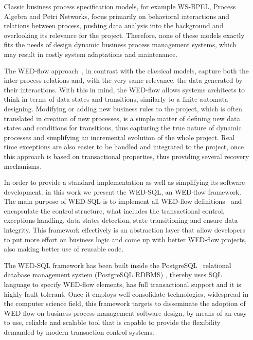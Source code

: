 \documentclass[12pt]{article}
\begin{document}
\par  Classic business process specification models, for example WS-BPEL, Process Algebra and Petri Networks, focus primarily
on behavioral interactions and relations between process, pushing data analysis into the background and overlooking its
relevance for the project. Therefore, none of these models exactly fits the needs of design dynamic business process 
management systems, which may result in costly system adaptations and maintenance.

\par  The WED-flow approach~\cite{ICWS12}, in contrast with the classical models, capture both the inter-process relations 
and, with the very same relevance, the data generated by their interactions. With this in mind, the WED-flow allows systems architects to 
think in terms of data states and transitions, similarly to a finite automata designing. Modifying or adding new business 
rules to the project, which is often translated in creation of new processes, is a simple matter of defining new data states 
and conditions for transitions, thus capturing the true nature of dynamic processes and simplifying an incremental evolution 
of the whole project. Real time exceptions are also easier to be handled and integrated to the project, once this approach
is based on transactional properties, thus providing several recovery mechanisms.

\par In order to provide a standard implementation as well as simplifying its software development, in this work we present 
the WED-SQL, an WED-flow framework. The main purpose of WED-SQL is to implement all WED-flow definitions~\cite{FTPM10} and encapsulate 
the control structure, what includes the transactional control, exceptions handling, data states detection, state transitioning 
and ensure data integrity. This framework effectively is an abstraction layer that allow developers to put more effort
on business logic and come up with better WED-flow projects, also making better use of reusable code. 

\par The WED-SQL framework has been built inside the PostgreSQL~\cite{PSQL} relational database management system (PostgreSQL RDBMS)
, thereby uses SQL language
to specify WED-flow elements, has full transactional support and it is highly fault tolerant. Once it employs well consolidate 
technologies, widespread in the computer science field, this framework targets to disseminate the adoption of WED-flow on
business process management software design, by means of an easy to use, reliable and scalable tool that is capable to 
provide the flexibility demanded by modern transaction control systems. 
\end{document}
